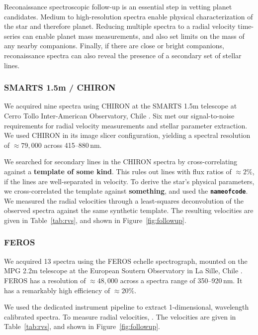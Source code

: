 \documentclass[12pt,twocolumn,tighten]{aastex63}
\begin{document}
Reconaissance spectroscopic follow-up is an essential step in vetting
planet candidates.  Medium to high-resolution spectra enable physical
characterization of the star and therefore planet.  Reducing multiple
spectra to a radial velocity time-series can enable planet mass
measurements, and also set limits on the mass of any nearby
companions.  Finally, if there are close or bright companions,
reconaissance spectra can also reveal the presence of a secondary set
of stellar lines.

\subsubsection{SMARTS 1.5m / CHIRON}
\label{subsec:chiron}

We acquired nine spectra using CHIRON at the SMARTS 1.5m telescope at
Cerro Tollo Inter-American Observatory, Chile
\citep{tokovinin_chironfiber_2013}.  Six met our signal-to-noise
requirements for radial velocity measurements and stellar parameter
extraction.  We used CHIRON in its image slicer configuration,
yielding a spectral resolution of $\approx 79{,}000$ across
415--880$\,$nm.

 We searched for secondary lines in
the CHIRON spectra by cross-correlating against a {\bf template of
some kind}.  This rules out lines with flux ratios of $\approx 2\%$,
if the lines are well-separated in velocity.  To derive the star's
physical parameters, we cross-correlated the template against {\bf
something}, and used the {\bf \texttt{nameofcode}}.  We measured the
radial velocities through a least-squares deconvolution of the
observed spectra against the same synthetic template.  The resulting
velocities are given in Table~\ref{tab:rvs}, and shown in
Figure~\ref{fig:followup}.


\subsubsection{FEROS}
We acquired 13 spectra using the FEROS echelle spectrograph, mounted
on the MPG 2.2m telescope at the European Soutern Observatory in La
Sille, Chile \citep{kaufer_commissioning_1999}.  FEROS has a
resolution of $\approx 48{,}000$ across a spectra range of
350--920$\,$nm. It has a remarkably high efficiency of $\approx 20\%$.

We used the dedicated instrument pipeline to extract 1-dimensional,
wavelength calibrated spectra.  To measure radial velocities, .  The
velocities are given in Table~\ref{tab:rvs}, and shown in
Figure~\ref{fig:followup}.
\end{document}
